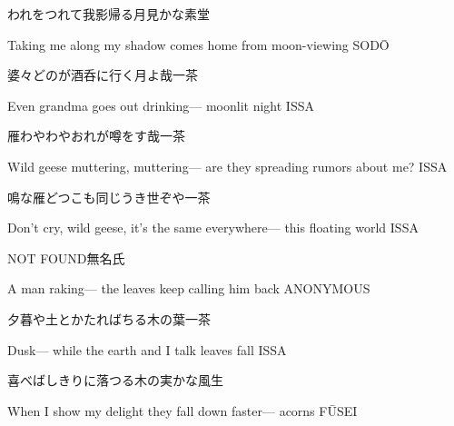 \begin{haiku}
    {\FH われをつれて我影帰る月見かな}\hfill{\FH 素堂}

    \vin{} Taking me along
    \vin{} \vin{} my shadow comes home
    \vin{} \vin{} \vin{} from moon-viewing \hspace{\fill} SOD\={O}
\end{haiku}

\begin{haiku}
    {\FH 婆々どのが酒呑に行く月よ哉}\hfill{\FH 一茶}

    \vin{} Even grandma
    \vin{} \vin{} goes out drinking---
    \vin{} \vin{} \vin{} moonlit night \hspace{\fill} ISSA
\end{haiku}

\begin{haiku}
    {\FH 雁わやわやおれが噂をす哉}\hfill{\FH 一茶}

    \vin{} Wild geese muttering, muttering---
    \vin{} \vin{} are they spreading
    \vin{} \vin{} \vin{} rumors about me? \hspace{\fill} ISSA
\end{haiku}

\begin{haiku}
    {\FH 鳴な雁どつこも同じうき世ぞや}\hfill{\FH 一茶}

    \vin{} Don't cry, wild geese,
    \vin{} \vin{} it's the same everywhere---
    \vin{} \vin{} \vin{} this floating world \hspace{\fill} ISSA
\end{haiku}

\begin{haiku}
    NOT FOUND\hfill{\FH 無名氏}

    \vin{} A man raking---
    \vin{} \vin{} the leaves keep
    \vin{} \vin{} \vin{} calling him back \hspace{\fill} ANONYMOUS
\end{haiku}

\begin{haiku}
    {\FH 夕暮や土とかたればちる木の葉}\hfill{\FH 一茶}

    \vin{} Dusk---
    \vin{} \vin{} while the earth and I talk
    \vin{} \vin{} \vin{} leaves fall \hspace{\fill} ISSA
\end{haiku}

\begin{haiku}
    {\FH 喜べばしきりに落つる木の実かな}\hfill{\FH 風生}

    \vin{} When I show my delight
    \vin{} \vin{} they fall down faster---
    \vin{} \vin{} \vin{} acorns \hspace{\fill} F\={U}SEI
\end{haiku}

